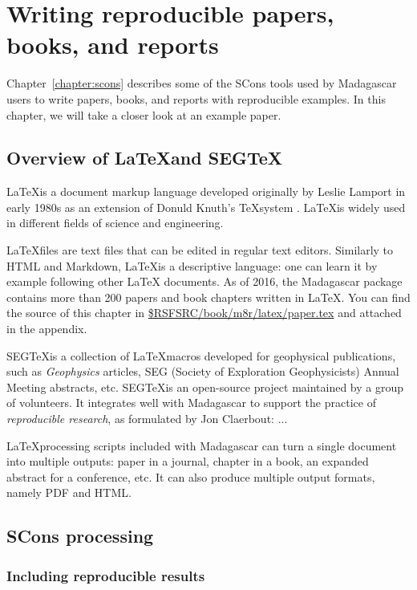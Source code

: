 \chapter{Writing reproducible papers, books, and reports}

Chapter~\ref{chapter:scons} describes some of the SCons tools used by
Madagascar users to write papers, books, and reports with reproducible
examples. In this chapter, we will take a closer look at an example paper.

\section{Overview of \LaTeX and SEG\TeX}

\LaTeX is a document markup language developed originally by Leslie
Lamport in early 1980s \cite[]{latex} as an extension of Donuld
Knuth's \TeX system \cite[]{tex}. \LaTeX is widely used in different
fields of science and engineering.

\LaTeX files are text files that can be edited in regular text
editors. Similarly to HTML and Markdown, \LaTeX is a descriptive
language: one can learn it by example following other \LaTeX
documents. As of 2016, the Madagascar package contains more than 200
papers and book chapters written in \LaTeX. You can find the source of
this chapter in
\href{https://github.com/ahay/src/blob/master/book/m8r/latex/paper.tex}
     {\$RSFSRC/book/m8r/latex/paper.tex}
and attached in the appendix.

SEG\TeX is a collection of \LaTeX macros developed for geophysical
publications, such as \emph{Geophysics} articles, SEG (Society of
Exploration Geophysicists) Annual Meeting abstracts, etc. SEG\TeX is
an open-source project maintained by a group of volunteers. It
integrates well with Madagascar to support the practice of
\emph{reproducible research}, as formulated by Jon Claerbout: ...

\LaTeX processing scripts included with Madagascar can turn a single
document into multiple outputs: paper in a journal, chapter in a book,
an expanded abstract for a conference, etc. It can also produce
multiple output formats, namely PDF and HTML.

\section{SCons processing}

\subsection{Including reproducible results}

